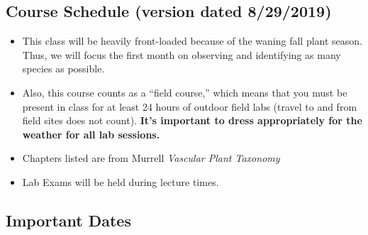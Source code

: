 \documentclass{tufte-handout}
\begin{document}
\begin{fullwidth}








\section{Course Schedule (version dated 8/29/2019)}

\begin{itemize}
	\item This class will be heavily front-loaded because of the waning fall plant season. Thus, we will focus the first month on observing and identifying as many species as possible.
	\item Also, this course counts as a ``field course,'' which means that you must be present in class for at least 24 hours of outdoor field labs (travel to and from field sites does not count). \textbf{It's important to dress appropriately for the weather for all lab sessions.}
	\item Chapters listed are from Murrell \emph{Vascular Plant Taxonomy}
	\item Lab Exams will be held during lecture times.
\end{itemize}

\subsection{Important Dates}


\end{fullwidth}
\end{document}
